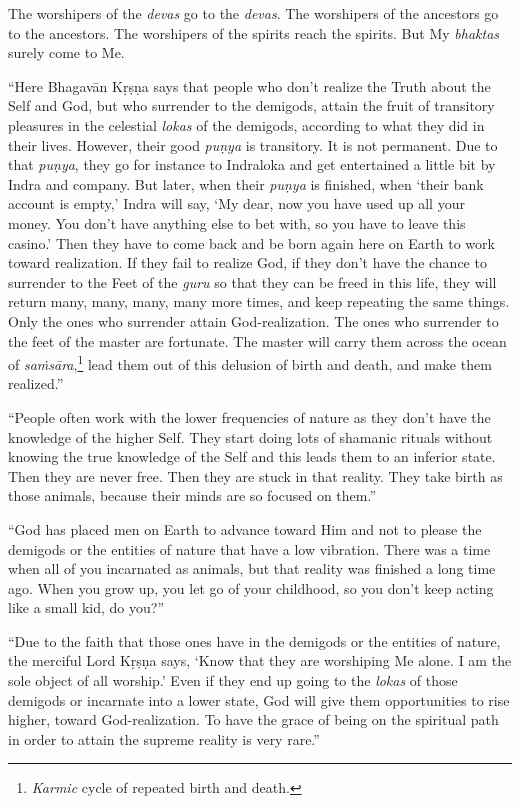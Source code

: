 {The worshipers of the \textit{devas} go to the \textit{devas}. The worshipers of the ancestors go to the ancestors. The worshipers of the spirits reach the spirits. But My \textit{bhaktas} surely come to Me.}

\enquote{Here Bhagavān Kṛṣṇa says that people who don’t realize the Truth about the Self and God, but who surrender to the demigods, attain the fruit of transitory pleasures in the celestial \textit{lokas} of the demigods, according to what they did in their lives. However, their good \textit{puṇya} is transitory. It is not permanent. Due to that \textit{puṇya}, they go for instance to Indraloka and get entertained a little bit by Indra and company. But later, when their \textit{puṇya} is finished, when \enquote{their bank account is empty,} Indra will say, \enquote{My dear, now you have used up all your money. You don’t have anything else to bet with, so you have to leave this casino.} Then they have to come back and be born again here on Earth to work toward realization. If they fail to realize God, if they don’t have the chance to surrender to the Feet of the \textit{guru} so that they can be freed in this life, they will return many, many, many, many more times, and keep repeating the same things. Only the ones who surrender attain God-realization. The ones who surrender to the feet of the master are fortunate. The master will carry them across the ocean of \textit{saṁsāra},\footnote{\textit{Karmic} cycle of repeated birth and death.} lead them out of this delusion of birth and death, and make them realized.}

\enquote{People often work with the lower frequencies of nature as they don’t have the knowledge of the higher Self. They start doing lots of shamanic rituals without knowing the true knowledge of the Self and this leads them to an inferior state. Then they are never free. Then they are stuck in that reality. They take birth as those animals, because their minds are so focused on them.}

\enquote{God has placed men on Earth to advance toward Him and not to please the demigods or the entities of nature that have a low vibration. There was a time when all of you incarnated as animals, but that reality was finished a long time ago. When you grow up, you let go of your childhood, so you don’t keep acting like a small kid, do you?}

\enquote{Due to the faith that those ones have in the demigods or the entities of nature, the merciful Lord Kṛṣṇa says, \enquote{Know that they are worshiping Me alone. I am the sole object of all worship.} Even if they end up going to the \textit{lokas} of those demigods or incarnate into a lower state, God will give them opportunities to rise higher, toward God-realization. To have the grace of being on the spiritual path in order to attain the supreme reality is very rare.}


